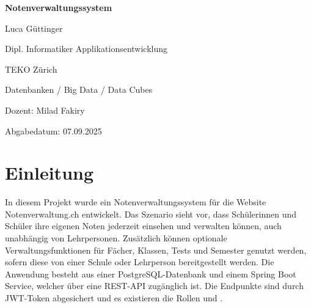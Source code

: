 \documentclass[12pt,a4paper]{article}
\newcommand{\code}[1]{\texttt{\detokenize{#1}}}
\begin{document}
    \hypersetup{pageanchor=false}
    \begin{titlepage}
        \centering
        {\huge\bfseries Notenverwaltungssystem \par}
        \vspace{2cm}
        {\Large Luca Güttinger \par}
        \vspace{0.5cm}
        {\Large Dipl. Informatiker Applikationsentwicklung \par}
        \vspace{0.5cm}
        {\Large TEKO Zürich \par}
        \vspace{0.5cm}
        {\Large Datenbanken / Big Data / Data Cubes \par}
        {\Large Dozent: Milad Fakiry \par}
        \vspace{0.5cm}
        {\Large Abgabedatum: 07.09.2025 \par}
        \vfill
    \end{titlepage}
    \clearpage
    \hypersetup{pageanchor=true}

    \tableofcontents
    \newpage



    \section{Einleitung}
    In diesem Projekt wurde ein Notenverwaltungssystem für die Website Notenverwaltung.ch entwickelt.
    Das Szenario sieht vor, dass Schülerinnen und Schüler ihre eigenen Noten jederzeit einsehen und verwalten können, auch unabhängig von Lehrpersonen.
    Zusätzlich können optionale Verwaltungsfunktionen für Fächer, Klassen, Tests und Semester genutzt werden,
    sofern diese von einer Schule oder Lehrperson bereitgestellt werden.
    Die Anwendung besteht aus einer PostgreSQL-Datenbank und einem Spring Boot Service, welcher über eine REST-API zugänglich ist.
    Die Endpunkte sind durch JWT-Token abgesichert und es existieren die Rollen \code{USER} und \code{ADMIN}.
\end{document}
